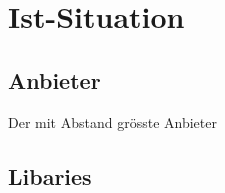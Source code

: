 \section{Ist-Situation}
\subsection{Anbieter}
Der mit Abstand grösste Anbieter

\subsection{Libaries}